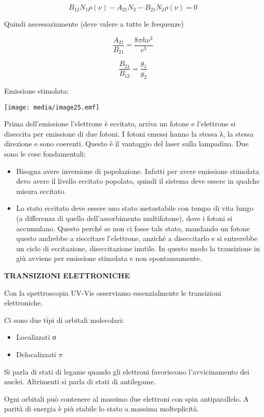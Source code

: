 \[B_{12}N_{1}\rho\left( \nu \right) - A_{21}N_{2} - B_{21}N_{2}\rho\left( \nu \right) = 0\]

Quindi necessariamente (deve valere a tutte le frequenze)

\[\frac{A_{21}}{B_{21}} = \frac{8\pi h\nu^{3}}{c^{3}}\]

\[\frac{B_{21}}{B_{12}} = \frac{g_{1}}{g_{2}}\]

Emissione stimolata:

\texttt{[image: media/image25.emf]}

Prima dell'emissione l'elettrone è eccitato, arriva un fotone e
l'elettrone si diseccita per emissione di due fotoni. I fotoni emessi
hanno la stessa λ, la stessa direzione e sono coerenti. Questo è il
vantaggio del laser sulla lampadina. Due sono le cose fondamentali:

\begin{itemize}
\item
  Bisogna avere inversione di popolazione. Infatti per avere emissione
  stimolata devo avere il livello eccitato popolato, quindi il sistema
  deve essere in qualche misura eccitato.
\item
  Lo stato eccitato deve essere uno stato metastabile con tempo di vita
  lungo (a differenza di quello dell'assorbimento multifotone), dove i
  fotoni si accumulano. Questo perché se non ci fosse tale stato,
  mandando un fotone questo andrebbe a rieccitare l'elettrone, anziché a
  diseccitarlo e si entrerebbe un ciclo di eccitazione, diseccitazione
  inutile. In questo modo la transizione in giù avviene per emissione
  stimolata e non spontaneamente.
\end{itemize}

\textbf{TRANSIZIONI ELETTRONICHE}

Con la spettroscopia UV-Vis osserviamo essenzialmente le transizioni
elettroniche.

Ci sono due tipi di orbitali molecolari:

\begin{itemize}
\item
  Localizzati σ
\item
  Delocalizzati \(\pi\)
\end{itemize}

Si parla di stati di legame quando gli elettroni favoriscono
l'avvicinamento dei nuclei. Altrimenti si parla di stati di antilegame.

Ogni orbitali può contenere al massimo due elettroni con spin
antiparallelo. A parità di energia è più stabile lo stato a massima
molteplicità.

